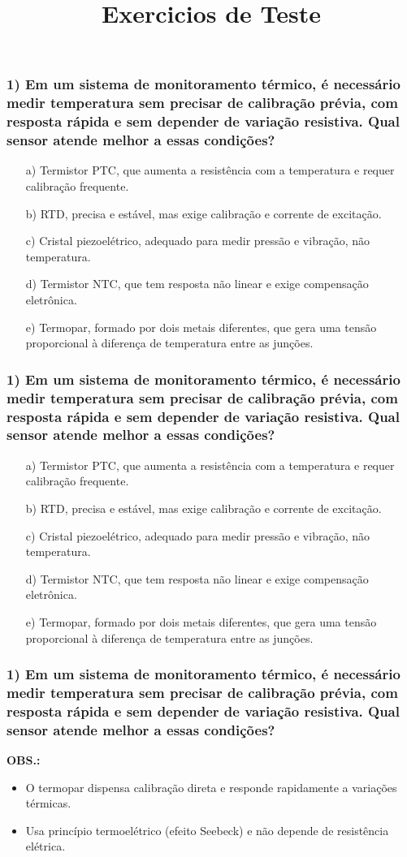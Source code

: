 \documentclass[12pt]{beamer}
\title{Exercicios de Teste}
\author{}
\date{}
\begin{document}
\frame{\titlepage}


\newcommand{\BodySize}{\footnotesize}

\begin{frame}
\frametitle{1) Em um sistema de monitoramento térmico, é necessário medir temperatura sem precisar de calibração prévia, com resposta rápida e sem depender de variação resistiva. Qual sensor atende melhor a essas condições?}
{\BodySize
\begin{itemize}
\item[a)] Termistor PTC, que aumenta a resistência com a temperatura e requer calibração frequente.
\item[b)] RTD, precisa e estável, mas exige calibração e corrente de excitação.
\item[c)] Cristal piezoelétrico, adequado para medir pressão e vibração, não temperatura.
\item[d)] Termistor NTC, que tem resposta não linear e exige compensação eletrônica.
\item[e)] Termopar, formado por dois metais diferentes, que gera uma tensão proporcional à diferença de temperatura entre as junções.
\end{itemize}
}
\end{frame}

\begin{frame}
\frametitle{1) Em um sistema de monitoramento térmico, é necessário medir temperatura sem precisar de calibração prévia, com resposta rápida e sem depender de variação resistiva. Qual sensor atende melhor a essas condições?}
{\BodySize
\begin{itemize}
\item[a)] Termistor PTC, que aumenta a resistência com a temperatura e requer calibração frequente.
\item[b)] RTD, precisa e estável, mas exige calibração e corrente de excitação.
\item[c)] Cristal piezoelétrico, adequado para medir pressão e vibração, não temperatura.
\item[d)] Termistor NTC, que tem resposta não linear e exige compensação eletrônica.
\item[e)] \alert{Termopar, formado por dois metais diferentes, que gera uma tensão proporcional à diferença de temperatura entre as junções.}
\end{itemize}
}
\end{frame}

\begin{frame}
\frametitle{1) Em um sistema de monitoramento térmico, é necessário medir temperatura sem precisar de calibração prévia, com resposta rápida e sem depender de variação resistiva. Qual sensor atende melhor a essas condições?}
{\BodySize
\textbf{OBS.:}
\begin{itemize}
\item O termopar dispensa calibração direta e responde rapidamente a variações térmicas.
\item Usa princípio termoelétrico (efeito Seebeck) e não depende de resistência elétrica.
\end{itemize}
}
\end{frame}
\end{document}
